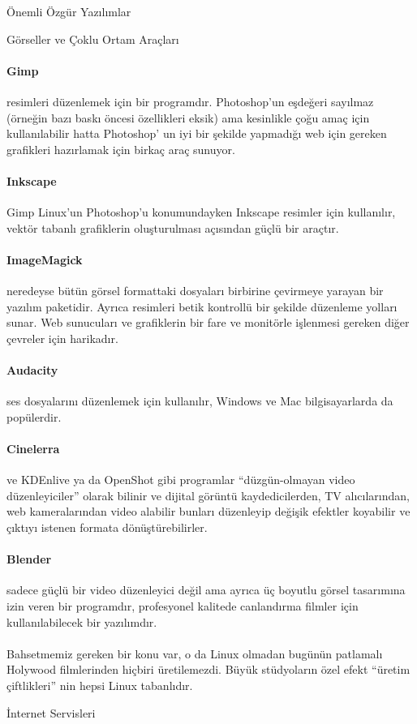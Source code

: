 \documentclass[10pt,a5paper]{book}
\begin{document}
\begin{section}{Önemli Özgür Yazılımlar}
\begin{subsection}{Görseller ve Çoklu Ortam Araçları}
\paragraph{Gimp}{resimleri düzenlemek için bir programdır. Photoshop'un eşdeğeri sayılmaz (örneğin bazı baskı öncesi özellikleri eksik) ama kesinlikle çoğu amaç için kullanılabilir hatta Photoshop' un iyi bir şekilde yapmadığı web için gereken grafikleri hazırlamak için birkaç araç sunuyor.}
\paragraph{Inkscape}{Gimp Linux'un Photoshop'u konumundayken Inkscape resimler için kullanılır, vektör tabanlı grafiklerin oluşturulması açısından güçlü bir araçtır.}
\paragraph{ImageMagick}{neredeyse bütün görsel formattaki dosyaları birbirine çevirmeye yarayan bir yazılım paketidir. Ayrıca resimleri betik kontrollü bir şekilde düzenleme yolları sunar. Web sunucuları ve grafiklerin bir fare ve monitörle işlenmesi gereken diğer çevreler için harikadır.}
\paragraph{Audacity}{ses dosyalarını düzenlemek için kullanılır, Windows ve Mac bilgisayarlarda da popülerdir.}
\paragraph{Cinelerra}{ve KDEnlive ya da OpenShot gibi programlar “düzgün-olmayan video düzenleyiciler” olarak bilinir ve dijital görüntü kaydedicilerden, TV alıcılarından, web kameralarından video alabilir bunları düzenleyip değişik efektler koyabilir ve çıktıyı istenen formata dönüştürebilirler.}
\paragraph{Blender}{sadece güçlü bir video düzenleyici değil ama ayrıca üç boyutlu görsel tasarımına izin veren bir programdır, profesyonel kalitede canlandırma filmler için kullanılabilecek bir yazılımdır.}
\paragraph{}{Bahsetmemiz gereken bir konu var, o da Linux olmadan bugünün patlamalı Holywood filmlerinden hiçbiri üretilemezdi. Büyük stüdyoların özel efekt “üretim çiftlikleri” nin hepsi Linux tabanlıdır.}
\end{subsection}
\begin{subsection}{İnternet Servisleri}

\end{subsection}
\end{section}
\end{document}
